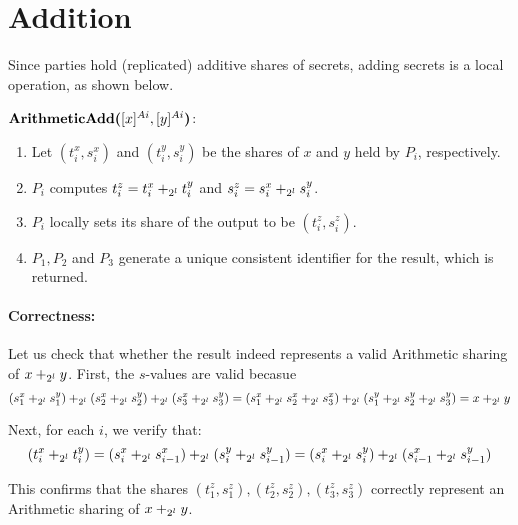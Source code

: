 \section{Addition}

Since parties hold (replicated) additive shares of secrets, adding secrets is a local operation, as shown below.

\begin{protocol}
	$\textbf{ArithmeticAdd(}[x]^{Ai}, [y]^{Ai}\textbf{)}$:
	\begin{enumerate}
		\item Let $(t^x_i, s^x_i)$ and $(t^y_i, s^y_i)$ be the shares of $x$ and $y$ held by $P_i$, respectively.
		\item $P_i$ computes $t^z_i = t^x_i +_{2^l} t^y_i$ and 
			$s^z_i = s^x_i +_{2^l} s^y_i$.
		\item $P_i$ locally sets its share of the output to be $(t^z_i, s^z_i)$.
		\item $P_1, P_2$ and $P_3$ generate a unique consistent identifier
			for the result, which is returned.
	\end{enumerate}
\end{protocol}

\paragraph{Correctness:} 

Let us check that whether the result indeed represents a valid Arithmetic sharing of $x +_{2^l} y$. First, the $s$-values are valid becasue
\begin{equation}
    (s^x_1 +_{2^l} s^y_1) +_{2^l} (s^x_2 +_{2^l} s^y_2) +_{2^l} (s^x_3 +_{2^l} s^y_3) = (s^x_1 +_{2^l} s^x_2 +_{2^l} s^x_3) +_{2^l} (s^y_1 +_{2^l} s^y_2 +_{2^l} s^y_3) = x +_{2^l} y
\end{equation}

Next, for each $i$, we verify that:
\begin{equation}
    (t^x_i +_{2^l} t^y_i) = (s^x_i +_{2^l} s^x_{i - 1}) +_{2^l} (s^y_i +_{2^l} s^y_{i - 1}) = (s^x_i +_{2^l} s^y_i) +_{2^l} (s^x_{i - 1} +_{2^l} s^y_{i - 1})
\end{equation}

This confirms that the shares $(t^z_1, s^z_1), (t^z_2, s^z_2), (t^z_3, s^z_3)$ correctly represent an Arithmetic sharing of $x +_{2^l} y$.